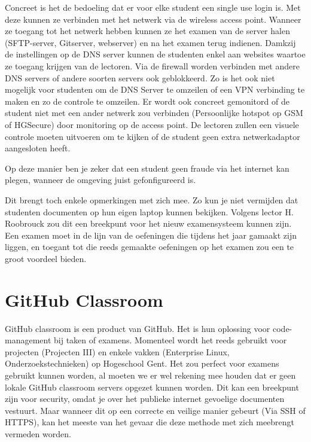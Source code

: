 Concreet is het de bedoeling dat er voor elke student een single use login is. Met deze kunnen ze verbinden met het netwerk via de wireless access point. Wanneer ze toegang tot het netwerk hebben kunnen ze het examen van de server halen (SFTP-server, Gitserver, webserver) en na het examen terug indienen. Damkzij de instellingen op de DNS server kunnen de studenten enkel aan websites waartoe ze toegang krijgen van de lectoren. Via de firewall worden verbinden met andere DNS servers of andere soorten servers ook geblokkeerd. Zo is het ook niet mogelijk voor studenten om de DNS Server te omzeilen of een VPN verbinding te maken en zo de controle te omzeilen. Er wordt ook concreet gemonitord of de student niet met een ander netwerk zou verbinden (Persoonlijke hotspot op GSM of HGSecure) door monitoring op de access point. De lectoren zullen een visuele controle moeten uitvoeren om te kijken of de student geen extra netwerkadaptor aangesloten heeft. 

Op deze manier ben je zeker dat een student geen fraude via het internet kan plegen, wanneer de omgeving juist gefonfigureerd is.

Dit brengt toch enkele opmerkingen met zich mee. Zo kun je niet vermijden dat studenten documenten op hun eigen laptop kunnen bekijken. Volgens lector H. Roobrouck zou dit een breekpunt voor het nieuw examensysteem kunnen zijn. Een examen moet in de lijn van de oefeningen die tijdens het jaar gamaakt zijn liggen, en toegant tot die reeds gemaakte oefeningen op het examen zou een te groot voordeel bieden. 




\section{GitHub Classroom}
\label{sec:GHC}

GitHub classroom is een product van GitHub. Het is hun oplossing voor code-management bij taken of examens. Momenteel wordt het reeds gebruikt voor projecten (Projecten III) en enkele vakken (Enterprise Linux, Onderzoekstechnieken) op Hogeschool Gent. Het zou perfect voor examens gebruikt kunnen worden, al moeten we er wel rekening mee houden dat er geen lokale GitHub classroom servers opgezet kunnen worden. Dit kan een breekpunt zijn voor security, omdat je over het publieke internet gevoelige documenten vestuurt. Maar wanneer dit op een correcte en veilige manier gebeurt (Via SSH of HTTPS), kan het meeste van het gevaar die deze methode met zich meebrengt vermeden worden. 

